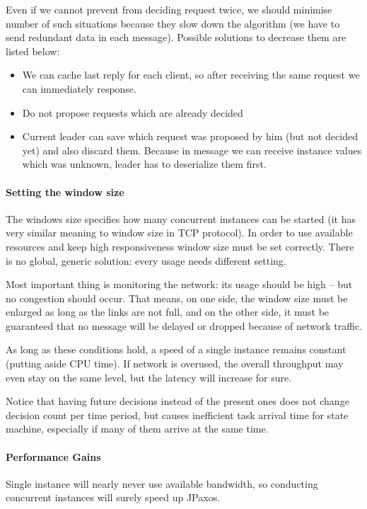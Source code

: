Even if we cannot prevent from deciding request twice, we should minimise number of such situations because they slow down the algorithm (we have to send redundant data in each message). Possible solutions to decrease them are listed below:
\begin{itemize}
  \item We can cache last reply for each client, so after receiving the same request we can immediately response.
  \item Do not propose requests which are already decided
  \item Current leader can save which request was proposed by him (but not decided yet) and also discard them. Because in \prepareOK message we can receive instance values which was unknown, leader has to deserialize them first.
\end{itemize}

\paragraph{Setting the window size}
The windows size specifies how many concurrent instances can be started (it has very similar meaning to window size in TCP protocol). In order to use available resources and keep high responsiveness window size must be set correctly. There is no global, generic solution: every usage needs different setting.

Most important thing is monitoring the network: its usage should be high -- but no congestion should occur.
That means, on one side, the window size must be enlarged as long as the links are not full, and on the other side, it must be guaranteed that no message will be delayed or dropped because of network traffic.

As long as these conditions hold, a speed of a single instance remains constant (putting aside CPU time).
If network is overused, the overall throughput may even stay on the same level, but the latency will increase for sure.

Notice that having future decisions instead of the present ones does not change decision count per time period, but causes inefficient task arrival time for state machine, especially if many of them arrive at the same time.

\paragraph{Performance Gains}
Single instance will nearly never use available bandwidth, so conducting concurrent instances will surely speed up JPaxos.

